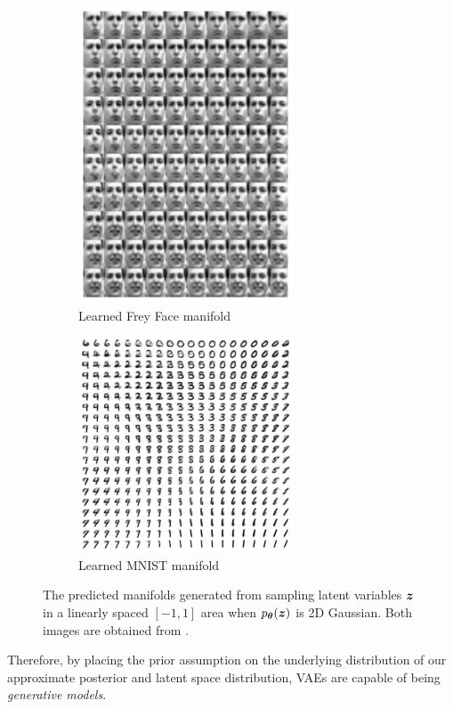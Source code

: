 \begin{figure}[hbt]
    \begin{subfigure}[b]{0.41\textwidth}
        \centering
        \includegraphics[width=0.7\textwidth]{figures/2_/2_face_manifold.png}
        \caption{Learned Frey Face manifold}
        \label{fig:2_face_manifold}
    \end{subfigure}
    \hfill
    \begin{subfigure}[b]{0.57\textwidth}
        \centering
        \includegraphics[width=0.7\textwidth]{figures/2_/2_mnist_manifold.png}
        \caption{Learned MNIST manifold}
        \label{fig:2_mnist_manifold}
    \end{subfigure}
    \caption{The predicted manifolds generated from sampling latent variables $\boldsymbol{z}$ in a linearly spaced $[-1, 1]$ area when $p_{\boldsymbol{\theta}}(\boldsymbol{z})$ is 2D Gaussian. Both images are obtained from \cite{variational_bayes}.}
    \label{fig:2_manifolds}
\end{figure}
Therefore, by placing the prior assumption on the underlying distribution of our approximate posterior and latent space distribution, VAEs are capable of being \textit{generative models}. 

